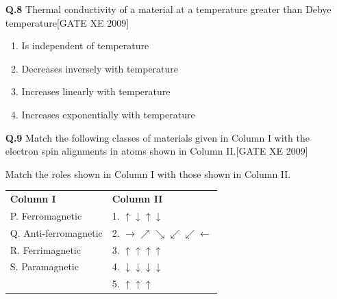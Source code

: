 \documentclass[journal,12pt,onecolumn]{IEEEtran}
\theoremstyle{remark}
\begin{document}
\begin{enumerate}
\begin{enumerate}
\vspace{0.3cm}

\item[\textbf{Q.8}] Thermal conductivity of a material at a temperature greater than Debye temperature\hfill[GATE XE 2009]

\begin{multicols}{2}
\begin{enumerate}
    \item Is independent of temperature
    \item Decreases inversely with temperature
    \item Increases linearly with temperature
    \item Increases exponentially with temperature
\end{enumerate}
\end{multicols}


\vspace{0.5cm}



\item [\textbf{Q.9}] Match the following classes of materials given in Column I with the electron spin alignments in atoms shown in Column II.\hfill[GATE XE 2009]

\vspace{1em}

\noindent
Match the roles shown in Column I with those shown in Column II.

\begin{tabular}{@{}p{}p{}@{}}
\textbf{Column I} & \textbf{Column II} \\
P. Ferromagnetic & 1. $\uparrow\downarrow\uparrow\downarrow$ \\
Q. Anti-ferromagnetic & 2. $\rightarrow \nearrow \searrow\swarrow\swarrow \leftarrow$ \\
R. Ferrimagnetic & 3. $\uparrow\uparrow\uparrow\uparrow$ \\
S. Paramagnetic & 4. $\downarrow\downarrow\downarrow\downarrow$ \\
& 5. $\uparrow\uparrow\uparrow$ \\
\end{tabular}

\vspace{1em}

\begin{enumerate}
\end{enumerate}


\end{enumerate}
\end{enumerate}
\end{document}
